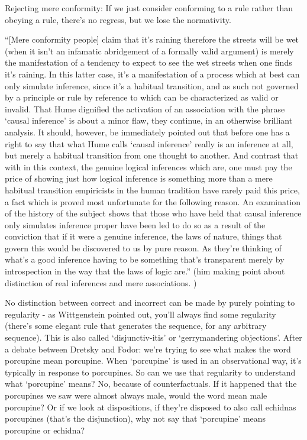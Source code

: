 \documentclass[12pt,a4paper]{report}
\begin{document}
Rejecting mere conformity: If we just consider conforming to a rule rather than obeying a rule, there's no regress, but we lose the normativity.

``[Mere conformity people] claim that it's raining therefore the streets will be wet (when it isn't an infamatic abridgement of a formally valid argument) is merely the manifestation of a tendency to expect to see the wet streets when one finds it's raining. In this latter case, it's a manifestation of a process which at best can only simulate inference, since it's a habitual transition, and as such not governed by a principle or rule by reference to which can be characterized as valid or invalid. That Hume dignified the activation of an association with the phrase `causal inference' is about a minor flaw, they continue, in an otherwise brilliant analysis. It should, however, be immediately pointed out that before one has a right to say that what Hume calls `causal inference' really is an inference at all, but merely a habitual transition from one thought to another. And contrast that with in this context, the genuine logical inferences which are, one must pay the price of showing just how logical inference is something more than a mere habitual transition empiricists in the human tradition have rarely paid this price, a fact which is proved most unfortunate for the following reason. An examination of the history of the subject shows that those who have held that causal inference only simulates inference proper have been led to do so as a result of the conviction that if it were a genuine inference, the laws of nature, things that govern this would be discovered to us by pure reason.  As they're thinking of what's a good inference having to be something that's transparent merely by introspection in the way that the laws of logic are.'' (him making point about distinction of real inferences and mere associations. )

No distinction between correct and incorrect can be made by purely pointing to regularity - as Wittgenstein pointed out, you'll always find some regularity (there's some elegant rule that generates the sequence, for any arbitrary sequence). This is also called `disjunctiv-itis' or `gerrymandering objections'. After a debate between Dretsky and Fodor: we're trying to see what makes the word porcupine mean porcupine. When `porcupine' is used in an observational way, it's typically in response to porcupines. So can we use that regularity to understand what `porcupine' means? No, because of counterfactuals. If it happened that the porcupines we saw were almost always male, would the word mean male porcupine? Or if we look at dispositions, if they're disposed to also call echidnas porcupines (that's the disjunction), why not say that `porcupine' means porcupine or echidna?
\end{document}
